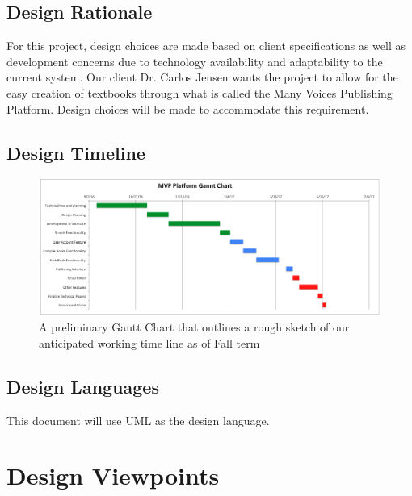 \documentclass[letterpaper, 10pt, draftclsnofoot, compsoc, onecolumn]{IEEEtran}
\begin{document}

\subsection{Design Rationale}
{\noindent For this project, design choices are made based on client specifications as well as development concerns
due to technology availability and adaptability to the current system.
Our client Dr. Carlos Jensen wants the project to allow for the easy creation of
textbooks through what is called the Many Voices Publishing Platform.
Design choices will be made to accommodate this requirement.\par}

\subsection{Design Timeline}
\begin{figure}[ht!]
\centering
\includegraphics[width=160mm]{gantt_chart.png}
\caption{A preliminary Gantt Chart that outlines a rough sketch of our anticipated working time line as of Fall term}
\end{figure}

\subsection{Design Languages}
{\noindent This document will use UML as the design language.\par}





\clearpage
\section{Design Viewpoints}
\end{document}
